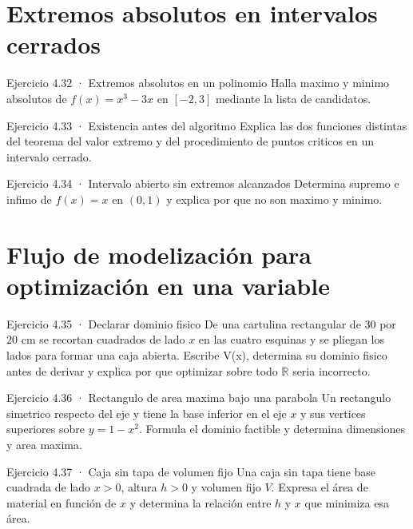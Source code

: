 \documentclass[10pt,a4paper,oneside,openany]{book}
\begin{document}
\section{Extremos absolutos en intervalos cerrados}
\begin{PSevenExerciseFixed}{Ejercicio 4.32 · Extremos absolutos en un polinomio}
Halla maximo y minimo absolutos de \(f(x)=x^{3}-3x\) en \([-2,3]\) mediante la lista de candidatos.
\end{PSevenExerciseFixed}
\begin{PSevenExerciseFixed}{Ejercicio 4.33 · Existencia antes del algoritmo}
Explica las dos funciones distintas del teorema del valor extremo y del procedimiento de puntos criticos en un intervalo cerrado.
\end{PSevenExerciseFixed}
\begin{PSevenExerciseFixed}{Ejercicio 4.34 · Intervalo abierto sin extremos alcanzados}
Determina supremo e infimo de \(f(x)=x\) en \((0,1)\) y explica por que no son maximo y minimo.
\end{PSevenExerciseFixed}
\section{Flujo de modelización para optimización en una variable}
\begin{PSevenExerciseFixed}{Ejercicio 4.35 · Declarar dominio fisico}
De una cartulina rectangular de \(30\) por \(20\) cm se recortan cuadrados de lado \(x\) en las cuatro esquinas y se pliegan los lados para formar una caja abierta. Escribe V(x), determina su dominio fisico antes de derivar y explica por que optimizar sobre todo \(\mathbb{R}\) seria incorrecto.
\end{PSevenExerciseFixed}
\begin{PSevenExerciseFixed}{Ejercicio 4.36 · Rectangulo de area maxima bajo una parabola}
Un rectangulo simetrico respecto del eje y tiene la base inferior en el eje \(x\) y sus vertices superiores sobre \(y=1-x^{2}\). Formula el dominio factible y determina dimensiones y area maxima.
\end{PSevenExerciseFixed}
\begin{PSevenExerciseFixed}{Ejercicio 4.37 · Caja sin tapa de volumen fijo}
Una caja sin tapa tiene base cuadrada de lado \(x>0\), altura \(h>0\) y volumen fijo \(V\). Expresa el área de material en función de \(x\) y determina la relación entre \(h\) y \(x\) que minimiza esa área.
\end{PSevenExerciseFixed}
\end{document}
